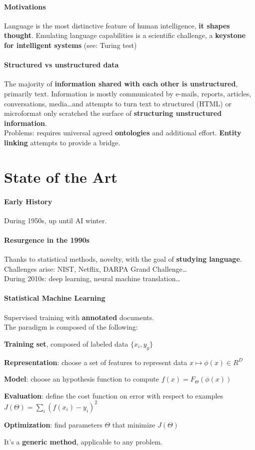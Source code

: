 \documentclass[10pt]{report}
\begin{document}
\paragraph{Motivations} Language is the most distinctive feature of human intelligence, \textbf{it shapes thought}. Emulating language capabilities is a scientific challenge, a \textbf{keystone for intelligent systems} (see: Turing test)
\paragraph{Structured vs unstructured data} The majority of \textbf{information shared with each other is unstructured}, primarily text. Information is mostly communicated by e-mails, reports, articles, conversations, media\ldots and attempts to turn text to structured (HTML) or microformat only scratched the surface of \textbf{structuring unstructured information}.\\
Problems: requires universal agreed \textbf{ontologies} and additional effort. \textbf{Entity linking} attempts to provide a bridge.
\section{State of the Art}
\paragraph{Early History} During 1950s, up until AI winter.
\paragraph{Resurgence in the 1990s} Thanks to statistical methods, novelty, with the goal of \textbf{studying language}. Challenges arise: NIST, Netflix, DARPA Grand Challenge\ldots\\
During 2010s: deep learning, neural machine translation\ldots
\paragraph{Statistical Machine Learning} Supervised training with \textbf{annotated} documents.\\
The paradigm is composed of the following:
\begin{list}{}{}
	\item \textbf{Training set}, composed of labeled data $\{x_i,y_y\}$
	\item \textbf{Representation}: choose a set of features to represent data $x\mapsto \phi(x) \in R^D$
	\item \textbf{Model}: choose an hypothesis function to compute $f(x) = F_\Theta(\phi(x))$
	\item \textbf{Evaluation}: define the cost function on error with respect to examples $J(\Theta) = \sum_i (f(x_i) - y_i)^2$
	\item \textbf{Optimization}: find parameters $\Theta$ that minimize $J(\Theta)$
\end{list}
It's a \textbf{generic method}, applicable to any problem.
\end{document}
